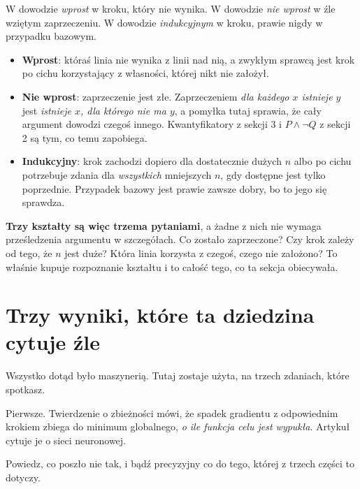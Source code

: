 \begin{fr}
\begin{ansblock}
W dowodzie \emph{wprost} \dash{} w kroku, który nie wynika. W dowodzie
\emph{nie wprost} \dash{} w źle wziętym zaprzeczeniu. W dowodzie
\emph{indukcyjnym} \dash{} w kroku, prawie nigdy w przypadku bazowym.
\end{ansblock}

\begin{itemize}
\item \textbf{Wprost}: któraś linia nie wynika z linii nad nią, a zwykłym
  sprawcą jest krok po cichu korzystający z własności, której nikt nie
  założył.
\item \textbf{Nie wprost}: zaprzeczenie jest złe. Zaprzeczeniem
  \emph{dla każdego $x$ istnieje $y$} jest \emph{istnieje $x$, dla którego
  nie ma $y$}, a pomyłka tutaj sprawia, że cały argument dowodzi czegoś
  innego. Kwantyfikatory z sekcji 3 i $P \wedge \lnot Q$ z sekcji 2 są tym,
  co temu zapobiega.
\item \textbf{Indukcyjny}: krok zachodzi dopiero dla dostatecznie dużych $n$
  albo po cichu potrzebuje zdania dla \emph{wszystkich} mniejszych $n$, gdy
  dostępne jest tylko poprzednie. Przypadek bazowy jest prawie zawsze dobry,
  bo to jego się sprawdza.
\end{itemize}

\textbf{Trzy kształty są więc trzema pytaniami}, a żadne z nich nie wymaga
prześledzenia argumentu w szczegółach. Co zostało zaprzeczone? Czy krok zależy
od tego, że $n$ jest duże? Która linia korzysta z czegoś, czego nie założono?
To właśnie kupuje rozpoznanie kształtu i to całość tego, co ta sekcja
obiecywała.
\end{fr}

\section{Trzy wyniki, które ta dziedzina cytuje źle}
\label{sec:P14-misquoted}

\begin{fr}
Wszystko dotąd było maszynerią. Tutaj zostaje użyta, na trzech zdaniach, które
spotkasz.

Pierwsze. Twierdzenie o zbieżności mówi, że spadek gradientu z odpowiednim
krokiem zbiega do minimum globalnego, \emph{o ile funkcja celu jest wypukła}.
Artykuł cytuje je o sieci neuronowej.

Powiedz, co poszło nie tak, i bądź precyzyjny co do tego, której z trzech
części to dotyczy.
\dotline
\nextframe
\end{fr}

